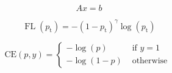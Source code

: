 \begin{equation}\label{eq_1}
\boxed{Ax=b}
\end{equation}

\begin{equation}
\operatorname{FL}\left(p_{\mathrm{t}}\right)=-\left(1-p_{\mathrm{t}}\right)^\gamma \log \left(p_{\mathrm{t}}\right)
\end{equation}

\begin{equation}\label{eq:CE}
\mathrm{CE}(p, y)= \begin{cases}-\log (p) & \text { if } y=1 \\ -\log (1-p) & \text { otherwise }\end{cases}
\end{equation}